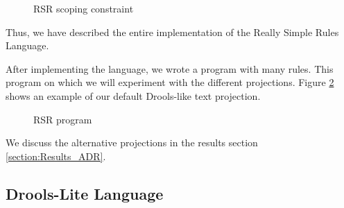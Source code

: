 \begin{figure}[h]
    \centering
    \caption{RSR scoping constraint}
    \label{fig:RSRConstraint}
\end{figure}

Thus, we have described the entire implementation of the Really Simple Rules Language.

After implementing the language, we wrote a program with many rules.
This program on which we will experiment with the different projections.
Figure \ref{fig:RSRProgram} shows an example of our default Drools-like text projection.

\begin{figure}[h]
    \centering
    \caption{RSR program}
    \label{fig:RSRProgram}
\end{figure}

We discuss the alternative projections in the results section \ref{section:Results_ADR}.

\subsection{Drools-Lite Language}
\label{section:DroolsLite}


